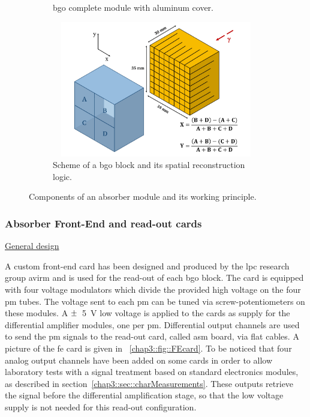 \begin{figure}
\begin{subfigure}[t]{.5\textwidth}
\caption{\gls{bgo} complete module with aluminum cover.}
\label{chap3::fig::originalBlock_withAl}
\end{subfigure}
\begin{subfigure}[t]{.5\textwidth}
\centering
\includegraphics[width=1\textwidth, height=16em]{03_GraphicFiles/chapter3_CLaRySproto/Absorber/block_scheme.pdf}
\caption{Scheme of a \gls{bgo} block and its spatial reconstruction logic.}
\label{chap3::fig::BGOblockScheme} 
\end{subfigure}
\caption{Components of an absorber module and its working principle.}
\label{chap5::fig::BGO_block}
\end{figure}


\subsubsection{Absorber Front-End and read-out cards}\label{chap3::subsubsec::AbsorberFEcard}

\underline{General design} 

A custom front-end card has been designed and produced by the \gls{lpc} research group \gls{avirm} and is used for the read-out of each \gls{bgo} block. The card is equipped with four voltage modulators which divide the provided high voltage on the four \gls{pm} tubes. The voltage sent to each \gls{pm} can be tuned via screw-potentiometers on these modules. A $\varpm$~5~V low voltage is applied to the cards as supply for the differential amplifier modules, one per \gls{pm}. Differential output channels are used to send the \gls{pm} signals to the read-out card, called \gls{asm} board, via flat cables. A picture of the \gls{fe} card is given in \figurename~\ref{chap3::fig::FEcard}. To be noticed that four analog output channels have been added on some cards in order to allow laboratory tests with a signal treatment based on standard electronics modules, as described in section~\ref{chap3::sec::charMeasurements}. These outputs retrieve the signal before the differential amplification stage, so that the low voltage supply is not needed for this read-out configuration.


